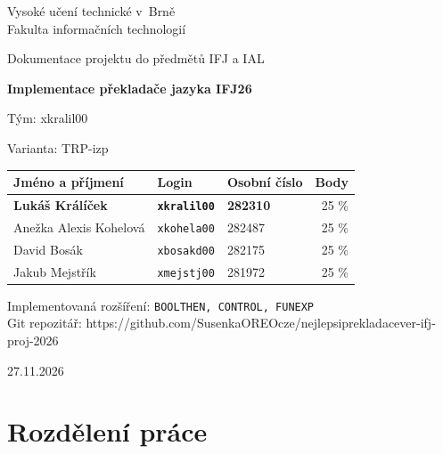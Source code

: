 \documentclass[a4paper,11pt]{article}
\begin{document}
 
\begin{titlepage}
  \centering
  {\Large Vysoké učení technické v~Brně\\Fakulta informačních technologií\par}
  \vspace{4cm}
  {\LARGE Dokumentace projektu do předmětů IFJ a IAL\par}
  \vspace{0.5cm}
  {\Huge\bfseries Implementace překladače jazyka IFJ26\par}
  \vspace{1.5cm}
  {\Large Tým: xkralil00\par}
  \vspace{0.3cm}
  {\Large Varianta: TRP-izp\par}
  \vspace{2cm}
 
  \begin{tabular}{l l l r}
    \toprule
    Jméno a příjmení & Login & Osobní číslo & Body \\
    \midrule
    {\textbf{Lukáš Králíček}} & \texttt{\textbf{xkralil00}} & \textbf{282310} & 25 \% \\
    {Anežka Alexis Kohelová} & \texttt{xkohela00} & 282487 & 25 \% \\
    {David Bosák} & \texttt{xbosakd00} & 282175 & 25 \% \\
    {Jakub Mejstřík} & \texttt{xmejstj00} & 281972 & 25 \% \\
    \bottomrule
  \end{tabular}
 
  \vspace{1.5cm}
  \begin{center}
    Implementovaná rozšíření: \texttt{BOOLTHEN, CONTROL, FUNEXP} \\
    Git repozitář: https://github.com/SusenkaOREOcze/nejlepsiprekladacever-ifj-proj-2026 \\
  \end{center}
 
  \vfill
  {{27.11.2026}\par}
\end{titlepage}
 
\tableofcontents
\newpage
 
\section{Rozdělení práce}
 
\end{document}
